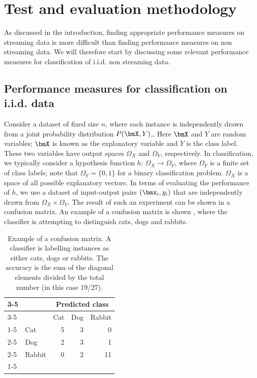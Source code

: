 \section{Test and evaluation methodology}
\label{sec:methodology}

As discussed in the introduction, finding appropriate performance measures on streaming data is more difficult than finding performance measures on non streaming data.  We will therefore start by discussing some relevant performance measures for classification of i.i.d. non streaming data. 

\subsection{Performance measures for classification on i.i.d. data}
\label{sec:static}

Consider a dataset of fixed size $n$, where each instance is independently drawn from a joint probability distribution $P(\bmX,Y)$,. Here  $\bmX$ and $Y$ are random variables; $\bmX$ is known as the explanatory variable and $Y$ is the class label.  These two variables have output spaces $\Omega_X$ and $\Omega_Y$, respectively.
In classification, we typically consider a hypothesis function $h: \, \Omega_X \rightarrow \Omega_Y$, where $\Omega_Y$ is a finite set of class labels; note that $\Omega_Y=\{0,1\}$  for a binary classification problem.
 $\Omega_X$ is a space of all possible explanatory vectors.  
In terms of evaluating the performance of $h$, we use a dataset of input-output pairs $(\bmx_i, y_i)$ that are independently drawn from $\Omega_X  \times \Omega_Y$. 
The result of such an experiment can be shown in a confusion matrix.  An example of a confusion matrix is shown , where the classifier is attempting to distinguish cats, dogs and rabbits. 

\vspace{1ex}
\begin{table}[ht]
\centering
\begin{tabular}{ll|r|r|r|}
\cline{3-5}
&&  \multicolumn{3}{c|}{Predicted class}\\
\cline{3-5}
&& Cat & Dog & Rabbit\\ 
\cline{1-5}
\multicolumn{1}{ |c| }{\multirow{3}{*}{Actual class} }
 & Cat & 5 & 3& 0\\
\cline{2-5}
\multicolumn{1}{ |c| }{} & Dog & 2 & 3 & 1\\
\cline{2-5}
\multicolumn{1}{ |c| }{} & Rabbit & 0 & 2 & 11\\
\cline{1-5}
\end{tabular}
\caption{Example of a confusion matrix.  A classifier is labelling instances as either cats, dogs or rabbits.  The accuracy is the sum of the diagonal elements divided by the total number (in this case 19/27).}
\label{tab:catdograbbit}
\end{table}
\vspace{1ex}

